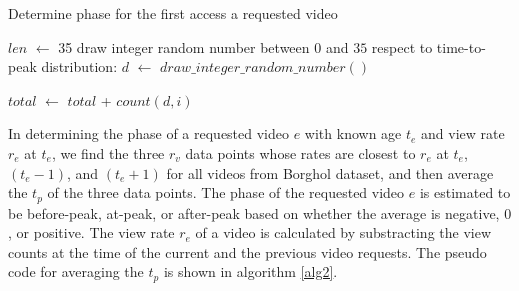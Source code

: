 \documentclass[10pt,final,journal,a4paper]{IEEEtran}
\begin{document}






\begin{algorithm}
\caption{Determine phase for the first access a requested video}
\label{alg3}
\begin{algorithmic}[1]

\STATE $len$ $\leftarrow$ 35 
\STATE draw integer random number between $0$ and $35$ respect to time-to-peak distribution: 
$d$ $\leftarrow$ $draw\_integer\_random\_number()$
\ENDFOR

\STATE $total$ $\leftarrow$ $total$ + $count(d,i)$ 
\ENDFOR
{}
\ELSE
{}
\ENDIF
\end{algorithmic}
\end{algorithm}

In determining the phase of a requested video $e$ with known age $t_e$ and view rate $r_e$ at $t_e$, we find the three $r_v$ data points whose rates are closest to $r_e$ at $t_e$, $(t_e - 1)$, and $(t_e + 1)$ for all videos from Borghol dataset, and then average the $t_p$ of the three data points.
The phase of the requested video $e$ is estimated to be before-peak, at-peak, or after-peak based on whether the average is negative, $0$, or positive.
The view rate $r_e$ of a video is calculated by substracting the view counts at the time of the current and the previous video requests.
The pseudo code for averaging the $t_p$ is shown in algorithm \ref{alg2}.
\end{document}

